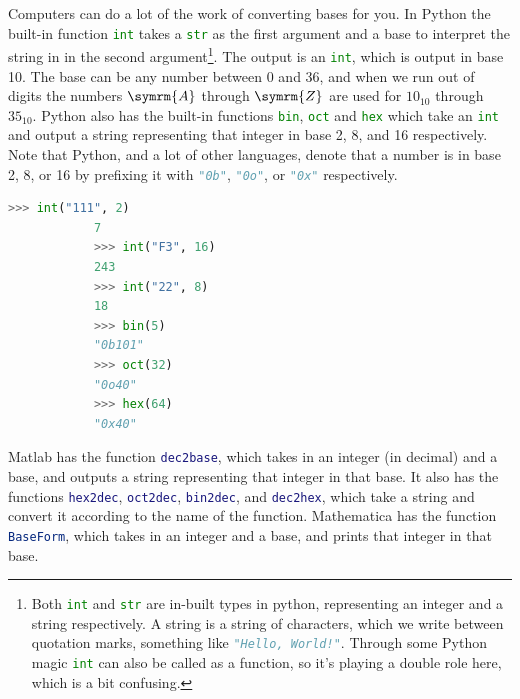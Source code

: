 \documentclass[fleqn]{LectureClass/LectureClass}
\newcommand{\hexadecimaldigit}[1]{\symrm{#1}}
\begin{document}
    \begin{cde}{}{}
        Computers can do a lot of the work of converting bases for you.
        In Python the built-in function \lstinline[language=python]|int| takes a \lstinline[language=python]|str| as the first argument and a base to interpret the string in in the second argument\footnote{Both \lstinline[language=python]|int| and \lstinline[language=python]|str| are in-built types in python, representing an integer and a string respectively. A string is a string of characters, which we write between quotation marks, something like \lstinline[language=python]|"Hello, World!"|. Through some Python magic \lstinline[language=python]|int| can also be called as a function, so it's playing a double role here, which is a bit confusing.}.
        The output is an \lstinline[language=python]|int|, which is output in base 10.
        The base can be any number between \(0\) and \(36\), and when we run out of digits the numbers \(\hexadecimaldigit{A}\) through \(\hexadecimaldigit{Z}\) are used for \(10_{10}\) through \(35_{10}\).
        Python also has the built-in functions \lstinline[language=python]|bin|, \lstinline[language=python]|oct| and \lstinline[language=python]|hex| which take an \lstinline[language=python]|int| and output a string representing that integer in base 2, 8, and 16 respectively.
        Note that Python, and a lot of other languages, denote that a number is in base 2, 8, or 16 by prefixing it with \lstinline[language=python]|"0b"|, \lstinline[language=python]|"0o"|, or \lstinline[language=python]|"0x"| respectively.
        \begin{lstlisting}[gobble=12, language=python]
            >>> int("111", 2)
            7
            >>> int("F3", 16)
            243
            >>> int("22", 8)
            18
            >>> bin(5)
            "0b101"
            >>> oct(32)
            "0o40"
            >>> hex(64)
            "0x40"
        \end{lstlisting}
        Matlab has the function \lstinline[language=matlab, keywords={dec2base}]|dec2base|, which takes in an integer (in decimal) and a base, and outputs a string representing that integer in that base.
        It also has the functions \lstinline[language=matlab]|hex2dec|, \lstinline[language=matlab, keywords={oct2dec}]|oct2dec|, \lstinline[language=matlab, keywords={bin2dec}]|bin2dec|, and \lstinline[language=matlab]|dec2hex|, which take a string and convert it according to the name of the function.
        Mathematica has the function \lstinline[language=mathematica]|BaseForm|, which takes in an integer and a base, and prints that integer in that base.
    \end{cde}
    
\end{document}
